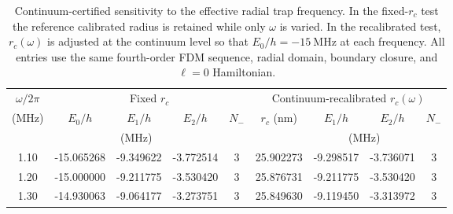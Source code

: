\begin{table}[t]
\centering
\caption{Continuum-certified sensitivity to the effective radial trap frequency. In the fixed-$r_c$ test the reference calibrated radius is retained while only $\omega$ is varied. In the recalibrated test, $r_c(\omega)$ is adjusted at the continuum level so that $E_0/h=-15~\mathrm{MHz}$ at each frequency. All entries use the same fourth-order FDM sequence, radial domain, boundary closure, and $\ell=0$ Hamiltonian.}
\label{tab:trap_frequency_sensitivity}
\begin{tabular}{c c c c c c c c c}
\hline
$\omega/2\pi$ & \multicolumn{4}{c}{Fixed $r_c$} & \multicolumn{4}{c}{Continuum-recalibrated $r_c(\omega)$} \\
(MHz) & $E_0/h$ & $E_1/h$ & $E_2/h$ & $N_-$ & $r_c$ (nm) & $E_1/h$ & $E_2/h$ & $N_-$ \\
& \multicolumn{3}{c}{(MHz)} & & & \multicolumn{2}{c}{(MHz)} & \\
\hline
1.10 & -15.065268 & -9.349622 & -3.772514 & 3 & 25.902273 & -9.298517 & -3.736071 & 3 \\
1.20 & -15.000000 & -9.211775 & -3.530420 & 3 & 25.876731 & -9.211775 & -3.530420 & 3 \\
1.30 & -14.930063 & -9.064177 & -3.273751 & 3 & 25.849630 & -9.119450 & -3.313972 & 3 \\
\hline
\end{tabular}
\end{table}
